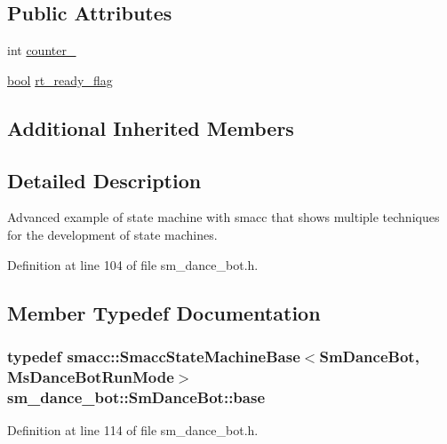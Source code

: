 \subsection*{Public Attributes}
\begin{DoxyCompactItemize}
\item 
int \hyperlink{structsm__dance__bot_1_1SmDanceBot_ab3b8db557ce94d34c60b291911eb140c}{counter\+\_}
\item 
\hyperlink{classbool}{bool} \hyperlink{structsm__dance__bot_1_1SmDanceBot_a0f0587a13670ad8925555cd8f6cb6b2d}{rt\+\_\+ready\+\_\+flag}
\end{DoxyCompactItemize}
\subsection*{Additional Inherited Members}


\subsection{Detailed Description}
Advanced example of state machine with smacc that shows multiple techniques for the development of state machines. 

Definition at line 104 of file sm\+\_\+dance\+\_\+bot.\+h.



\subsection{Member Typedef Documentation}
\subsubsection[{\texorpdfstring{base}{base}}]{\setlength{\rightskip}{0pt plus 5cm}typedef {\bf smacc\+::\+Smacc\+State\+Machine\+Base}$<${\bf Sm\+Dance\+Bot}, {\bf Ms\+Dance\+Bot\+Run\+Mode}$>$ {\bf sm\+\_\+dance\+\_\+bot\+::\+Sm\+Dance\+Bot\+::base}}\hypertarget{structsm__dance__bot_1_1SmDanceBot_a33b03e67fc72482c067af48e1f9d95a3}{}\label{structsm__dance__bot_1_1SmDanceBot_a33b03e67fc72482c067af48e1f9d95a3}


Definition at line 114 of file sm\+\_\+dance\+\_\+bot.\+h.


